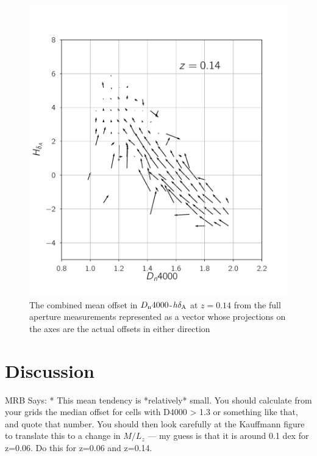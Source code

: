 \begin{figure}
\includegraphics[width=\textwidth]{figures/quiver_c.pdf}
\caption[ The combined mean offset in $D_{\rm n}4000$-$h\delta_{\rm A}$ at $z=0.14$ from the full aperture measurements represented as a vector whose projections on the axes are the actual offsets in either direction ]{ The combined mean offset in $D_{\rm n}4000$-$h\delta_{\rm A}$ at $z=0.14$ from the full aperture measurements represented as a vector whose projections on the axes are the actual offsets in either direction
\label{fig:offset_quiver3}}
\end{figure}

\section{Discussion}

MRB Says: * This mean tendency is *relatively* small. You should calculate from your grids the median offset for cells with D4000 > 1.3 or something like that, and quote that number. You should then look carefully at the Kauffmann figure to translate this to a change in $M/L_z$ --- my guess is that it is around 0.1 dex for z=0.06. Do this for z=0.06 and z=0.14.

